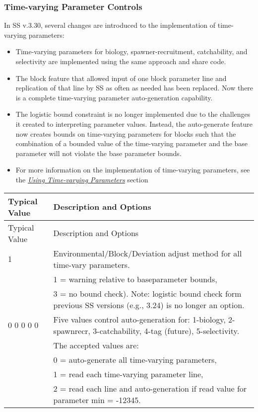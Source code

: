 \subsubsection{Time-varying Parameter Controls}
In SS v.3.30, several changes are introduced to the implementation of time-varying parameters:

\begin{itemize}
  \item	Time-varying parameters for biology, spawner-recruitment, catchability, and selectivity are implemented using the same approach and share code.
  \item The block feature that allowed input of one block parameter line and replication of that line by SS as often as needed has been replaced.  Now there is a complete time-varying parameter auto-generation capability.
  \item The logistic bound constraint is no longer implemented due to the challenges it created to interpreting parameter values.  Instead, the auto-generate feature now creates bounds on time-varying parameters for blocks such that the combination of a bounded  value of the time-varying parameter and the base parameter will not violate the base parameter bounds.
  \item For more information on the implementation of time-varying parameters, see the \hyperlink{TVpara}{\textit{Using Time-varying Parameters}} section
\end{itemize}	
	
\begin{longtable}{p{0.5cm} p{2cm} p{12cm}}
	\hline
	\multicolumn{2}{l}{Typical Value} & Description and Options\Tstrut\Bstrut\\
	\hline
	\endfirsthead

	\hline
	\multicolumn{2}{l}{Typical Value} & Description and Options\Tstrut\Bstrut\\
	\hline
	\endhead

	\hline
	\endfoot

	\endlastfoot

	1 & & Environmental/Block/Deviation adjust method for all time-vary parameters. \Tstrut\\
	  & & 1 = warning relative to baseparameter bounds, \\
	  & & 3 = no bound check). Note: logistic bound check form previous SS versions (e.g., 3.24) is no longer an option.\Bstrut\\

	\multicolumn{2}{l}{0 0 0 0 0} & Five values control auto-generation for: 1-biology, 2-spawnrecr, 3-catchability, 4-tag (future), 5-selectivity.\\
	&			& The accepted values are:\Tstrut\\
	&           & 0 = auto-generate all time-varying parameters,\\
	& 			& 1 = read each time-varying parameter line,\\
	&			& 2 = read each line and auto-generation if read value for parameter min = -12345. \Bstrut\\
	\hline
\end{longtable}


